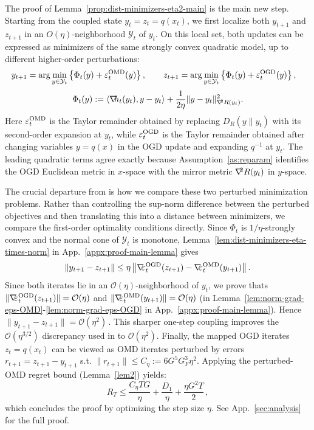 \documentclass[a4paper,11pt,fullpage]{article}
\def\Y{{\mathcal Y}}
\theoremstyle{plain}
\theoremstyle{definition}
\theoremstyle{plain}
\let\nablaold\nabla
\renewcommand{\nabla}{\nablaold\mkern-2.5mu}
\begin{document}
The proof of Lemma~\ref{prop:dist-minimizers-eta2-main} is the main new step. Starting from the coupled state \(y_t=z_t=q(x_t)\), we first localize both
\(y_{t+1}\) and \(z_{t+1}\) in an \(O(\eta)\)-neighborhood \(\Y_t\) of \(y_t\).
On this local set, both updates can be expressed as minimizers of the same
strongly convex quadratic model, up to different higher-order perturbations:
\begin{align*}
y_{t+1}
&=
\arg\min_{y\in \Y_t}
    \left\{
        \Phi_t(y)+\varepsilon_t^{\rm OMD}(y)
    \right\}, \qquad
z_{t+1}
=
\arg\min_{y\in \Y_t}
    \left\{
        \Phi_t(y)+\varepsilon_t^{\rm OGD}(y)
    \right\},
\end{align*}
\begin{equation*}
\Phi_t(y) := \langle \nabla h_t(y_t),y-y_t\rangle
+ \frac{1}{2\eta}\|y-y_t\|_{\nabla^2R(y_t)}^2.
\end{equation*}
Here \(\varepsilon_t^{\rm OMD}\) is the Taylor remainder obtained by replacing
\(D_R(y\|y_t)\) with its second-order expansion at \(y_t\), while
\(\varepsilon_t^{\rm OGD}\) is the Taylor remainder obtained after changing
variables \(y=q(x)\) in the OGD update and expanding \(q^{-1}\) at \(y_t\).
The leading quadratic terms agree exactly because Assumption~\ref{as:reparam}
identifies the OGD Euclidean metric in \(x\)-space with the mirror metric
\(\nabla^2R(y_t)\) in \(y\)-space.

The crucial departure from \citet{ghai-lu-hazan22} is how we compare these two
perturbed minimization problems. Rather than controlling the sup-norm difference
between the perturbed objectives and then translating this into a distance between
minimizers, we compare the first-order optimality conditions directly. Since
\(\Phi_t\) is \(1/\eta\)-strongly convex and the normal cone of \(\Y_t\) is
monotone, Lemma~\ref{lem:dist-minimizers-eta-times-norm} in App.~\ref{appx:proof-main-lemma} gives
\[
    \|y_{t+1}-z_{t+1}\|
    \le
    \eta
    \left\|
        \nabla \varepsilon_t^{\rm OGD}(z_{t+1})
        -
        \nabla \varepsilon_t^{\rm OMD}(y_{t+1})
    \right\|.
\]
Since both iterates lie in an $\mathcal{O}(\eta)$-neighborhood of $y_t$, we prove thats $\|\nabla \varepsilon_t^{\rm OGD}(z_{t+1})\| = \mathcal{O}(\eta)$ and $\|\nabla \varepsilon_t^{\rm OMD}(y_{t+1})\|= \mathcal{O}(\eta)$ (in Lemma~\ref{lem:norm-grad-eps-OMD}-\ref{lem:norm-grad-eps-OGD} in App.~\ref{appx:proof-main-lemma}). Hence $\|y_{t+1}-z_{t+1}\| = \mathcal{O}(\eta^2)\,.$ 
This sharper one-step coupling improves the $\mathcal{O}(\eta^{3/2})$ discrepancy
used in \citet{ghai-lu-hazan22} to $\mathcal{O}(\eta^2)$.
Finally, the mapped OGD iterates $z_t=q(x_t)$ can be viewed as OMD iterates
perturbed by errors \(r_{t+1}=z_{t+1}-y_{t+1}\) s.t.
\(\|r_{t+1}\|\le C_{\eta} := 6G^5G_F^3\eta^2\). Applying the perturbed-OMD regret bound
(Lemma~\ref{lem2}) yields: 
\begin{equation*}
R_T \le \frac{C_{\eta} T G}{\eta} + \frac{D_1}{\eta} +\frac{\eta G^2 T}{2}\,,
\end{equation*}
which concludes the proof by optimizing the step size $\eta$. See App.~\ref{sec:analysis} for the full proof.  
\end{document}
